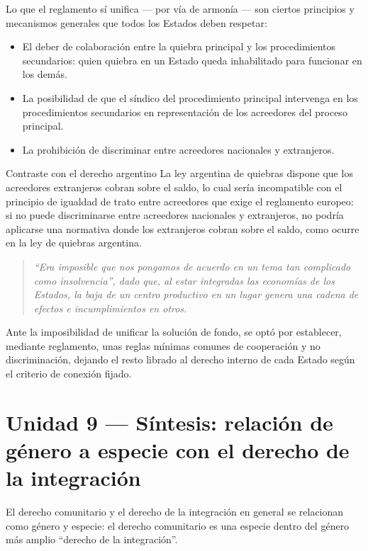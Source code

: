 \documentclass[12pt,oneside]{book}
\begin{document}
Lo que el reglamento sí unifica --- por vía de armonía --- son ciertos principios y mecanismos generales que todos los Estados deben respetar:

\begin{itemize}
    \item El deber de colaboración entre la quiebra principal y los procedimientos secundarios: quien quiebra en un Estado queda inhabilitado para funcionar en los demás.
    \item La posibilidad de que el síndico del procedimiento principal intervenga en los procedimientos secundarios en representación de los acreedores del proceso principal.
    \item La prohibición de discriminar entre acreedores nacionales y extranjeros.
\end{itemize}

\begin{example}{Contraste con el derecho argentino}
La ley argentina de quiebras dispone que los acreedores extranjeros cobran sobre el saldo, lo cual sería incompatible con el principio de igualdad de trato entre acreedores que exige el reglamento europeo: si no puede discriminarse entre acreedores nacionales y extranjeros, no podría aplicarse una normativa donde los extranjeros cobran sobre el saldo, como ocurre en la ley de quiebras argentina.
\end{example}

\begin{quote}
\itshape ``Era imposible que nos pongamos de acuerdo en un tema tan complicado como insolvencia'', dado que, al estar integradas las economías de los Estados, la baja de un centro productivo en un lugar genera una cadena de efectos e incumplimientos en otros.
\end{quote}

Ante la imposibilidad de unificar la solución de fondo, se optó por establecer, mediante reglamento, unas reglas mínimas comunes de cooperación y no discriminación, dejando el resto librado al derecho interno de cada Estado según el criterio de conexión fijado.

\section{Unidad 9 --- Síntesis: relación de género a especie con el derecho de la integración}

El derecho comunitario y el derecho de la integración en general se relacionan como género y especie: el derecho comunitario es una especie dentro del género más amplio ``derecho de la integración''.
\end{document}
